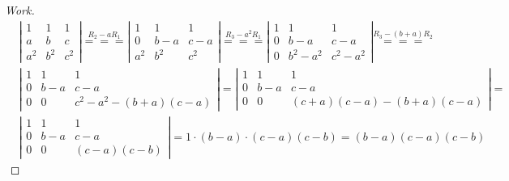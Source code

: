 \documentclass{article}
\begin{document}
\begin{proof}[Work]
  \begin{align*}
     & \left\lvert\begin{array}{ccc}
                    1   & 1   & 1   \\
                    a   & b   & c   \\
                    a^2 & b^2 & c^2
                  \end{array} \right\rvert \overset{R_2 - aR_1}{===}
    \left\lvert\begin{array}{ccc}
                 1   & 1   & 1   \\
                 0   & b-a & c-a \\
                 a^2 & b^2 & c^2
               \end{array} \right\rvert \overset{R_3 - a^2R_1}{===}
    \left\lvert\begin{array}{ccc}
                 1 & 1       & 1       \\
                 0 & b-a     & c-a     \\
                 0 & b^2-a^2 & c^2-a^2
               \end{array} \right\rvert \overset{R_3 - (b+a)R_2}{===}                         \\
     & \left\lvert\begin{array}{ccc}
                    1 & 1   & 1                    \\
                    0 & b-a & c-a                  \\
                    0 & 0   & c^2-a^2 - (b+a)(c-a)
                  \end{array} \right\rvert =
    \left\lvert\begin{array}{ccc}
                 1 & 1   & 1                       \\
                 0 & b-a & c-a                     \\
                 0 & 0   & (c+a)(c-a) - (b+a)(c-a)
               \end{array} \right\rvert =                                              \\
     & \left\lvert\begin{array}{ccc}
                    1 & 1   & 1          \\
                    0 & b-a & c-a        \\
                    0 & 0   & (c-a)(c-b)
                  \end{array} \right\rvert = 1 \cdot (b-a) \cdot (c-a)(c-b) = (b-a)(c-a)(c-b)
  \end{align*}
\end{proof}
\qdash
\end{document}
